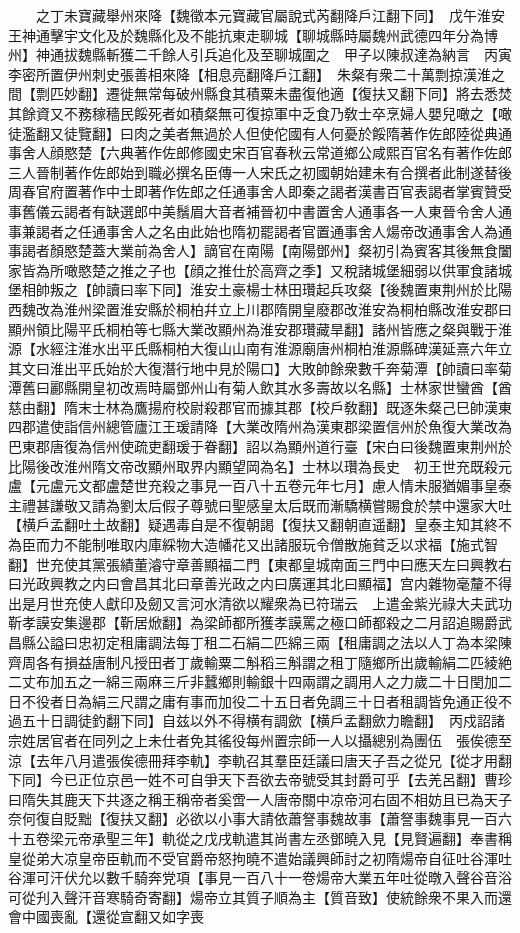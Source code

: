 　　之丁未寶藏舉州來降【魏徵本元寶藏官屬說式芮翻降戶江翻下同】　戊午淮安王神通擊宇文化及於魏縣化及不能抗東走聊城【聊城縣時屬魏州武德四年分為博州】神通拔魏縣斬獲二千餘人引兵追化及至聊城圍之　甲子以陳叔達為納言　丙寅李密所置伊州刺史張善相來降【相息亮翻降戶江翻】　朱粲有衆二十萬剽掠漢淮之間【剽匹妙翻】遷徙無常每破州縣食其積粟未盡復他適【復扶又翻下同】將去悉焚其餘資又不務稼穡民餒死者如積粲無可復掠軍中乏食乃敎士卒烹婦人嬰兒噉之【噉徒濫翻又徒覽翻】曰肉之美者無過於人但使佗國有人何憂於餒隋著作佐郎陸從典通事舍人顔愍楚【六典著作佐郎修國史宋百官春秋云常道鄉公咸熙百官名有著作佐郎三人晉制著作佐郎始到職必撰名臣傳一人宋氏之初國朝始建未有合撰者此制遂替後周春官府置著作中士即著作佐郎之任通事舍人即秦之謁者漢書百官表謁者掌賓贊受事舊儀云謁者有缺選郎中美鬚眉大音者補晉初中書置舍人通事各一人東晉令舍人通事兼謁者之任通事舍人之名由此始也隋初罷謁者官置通事舍人煬帝改通事舍人為通事謁者顏愍楚蓋大業前為舍人】謫官在南陽【南陽鄧州】粲初引為賓客其後無食闔家皆為所噉愍楚之推之子也【顔之推仕於高齊之季】又稅諸城堡細弱以供軍食諸城堡相帥叛之【帥讀曰率下同】淮安土豪楊士林田瓚起兵攻粲【後魏置東荆州於比陽西魏改為淮州梁置淮安縣於桐柏幷立上川郡隋開皇廢郡改淮安為桐柏縣改淮安郡曰顯州領比陽平氏桐柏等七縣大業改顯州為淮安郡瓚藏旱翻】諸州皆應之粲與戰于淮源【水經注淮水出平氏縣桐柏大復山山南有淮源廟唐州桐柏淮源縣碑漢延熹六年立其文曰淮出平氏始於大復潛行地中見於陽口】大敗帥餘衆數千奔菊潭【帥讀曰率菊潭舊曰酈縣開皇初改焉時屬鄧州山有菊人飲其水多壽故以名縣】士林家世蠻酋【酋慈由翻】隋末士林為鷹揚府校尉殺郡官而據其郡【校戶敎翻】既逐朱粲己巳帥漢東四郡遣使詣信州總管廬江王瑗請降【大業改隋州為漢東郡梁置信州於魚復大業改為巴東郡唐復為信州使疏吏翻瑗于眷翻】詔以為顯州道行臺【宋白曰後魏置東荆州於比陽後改淮州隋文帝改顯州取界内顯望岡為名】士林以瓚為長史　初王世充既殺元盧【元盧元文都盧楚世充殺之事見一百八十五卷元年七月】慮人情未服猶媚事皇泰主禮甚謙敬又請為劉太后假子尊號曰聖感皇太后既而漸驕横嘗賜食於禁中還家大吐【横戶孟翻吐土故翻】疑遇毒自是不復朝謁【復扶又翻朝直遥翻】皇泰主知其終不為臣而力不能制唯取内庫綵物大造幡花又出諸服玩令僧散施貧乏以求福【施式智翻】世充使其黨張績董濬守章善顯福二門【東都皇城南面三門中曰應天左曰興教右曰光政興教之内曰會昌其北曰章善光政之内曰廣運其北曰顯福】宫内雜物毫釐不得出是月世充使人獻印及劒又言河水清欲以耀衆為已符瑞云　上遣金紫光祿大夫武功靳孝謨安集邊郡【靳居焮翻】為梁師都所獲孝謨罵之極口師都殺之二月詔追賜爵武昌縣公謚曰忠初定租庸調法每丁租二石絹二匹綿三兩【租庸調之法以人丁為本梁陳齊周各有損益唐制凡授田者丁歲輸粟二斛稻三斛謂之租丁隨鄉所出歲輸絹二匹綾絶二丈布加五之一綿三兩麻三斤非蠶鄉則輸銀十四兩謂之調用人之力歲二十日閏加二日不役者日為絹三尺謂之庸有事而加役二十五日者免調三十日者租調皆免通正役不過五十日調徒釣翻下同】自兹以外不得横有調歛【横戶孟翻歛力瞻翻】　丙戍詔諸宗姓居官者在同列之上未仕者免其徭役每州置宗師一人以攝總别為團伍　張俟德至涼【去年八月遣張俟德冊拜李軌】李軌召其羣臣廷議曰唐天子吾之從兄【從才用翻下同】今已正位京邑一姓不可自爭天下吾欲去帝號受其封爵可乎【去羌呂翻】曹珍曰隋失其鹿天下共逐之稱王稱帝者奚啻一人唐帝關中凉帝河右固不相妨且已為天子奈何復自貶黜【復扶又翻】必欲以小事大請依蕭詧事魏故事【蕭詧事魏事見一百六十五卷梁元帝承聖三年】軌從之戊戌軌遣其尚書左丞鄧曉入見【見賢遍翻】奉書稱皇從弟大凉皇帝臣軌而不受官爵帝怒拘曉不遣始議興師討之初隋煬帝自征吐谷渾吐谷渾可汗伏允以數千騎奔党項【事見一百八十一卷煬帝大業五年吐從暾入聲谷音浴可從刋入聲汗音寒騎奇寄翻】煬帝立其質子順為主【質音致】使統餘衆不果入而還會中國喪亂【還從宣翻又如字喪